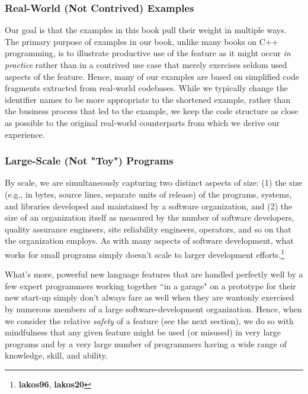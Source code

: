 \subsubsection[Real-World (Not Contrived) Examples]{Real-World (Not Contrived) Examples}

Our goal is that the examples in this book pull their weight in multiple ways. The primary purpose of examples in our book, unlike many books on C++ programming, is to illustrate productive use of the feature as it might occur \textit{in practice} rather than in a contrived use case that merely exercises seldom used aspects of the feature. Hence, many of our examples are based on simplified code fragments extracted from real-world codebases. While we typically change the identifier names to be more appropriate to the shortened example, rather than the business process that led to the example, we keep the code structure as close as possible to the original real-world counterparts from which we derive our experience.

\subsubsection[Large-Scale (Not ``Toy") Programs]{Large-Scale (Not "Toy") Programs}

By scale, we are simultaneously capturing two distinct aspects of size: (1) the size (e.g., in bytes, source lines, separate units of release) of the programs, systems, and libraries developed and maintained by a software organization, and (2) the size of an organization itself as measured by the number of software developers, quality assurance engineers, site reliability engineers, operators, and so on that the organization employs. As with many aspects of software development, what works for small programs simply doesn't scale to larger development efforts.\footnote{\textbf{lakos96}, \textbf{lakos20}} 

What's more, powerful new language features that are handled perfectly well by a few expert programmers working together ``in a garage" on a prototype for their new start-up simply don't always fare as well when they are wantonly exercised by numerous members of a large software-development organization. Hence, when we consider the relative \textit{safety} of a feature (see the next section), we do so with mindfulness that any given feature might be used (or misused) in very large programs and by a very large number of programmers having a wide range of knowledge, skill, and ability.

